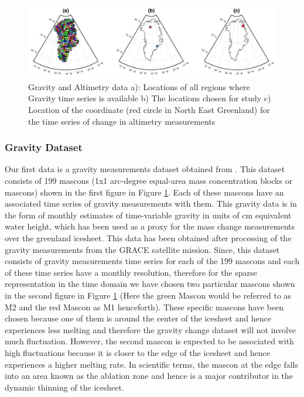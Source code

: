 \documentclass[procedia]{easychair}
\begin{document}
\begin{figure}[]  %
	\centering
	\includegraphics[width=5in]{grace_alt}
	\caption[Optional caption]{Gravity and Altimetry data a): Locations of all regions where Gravity time series is available b) The locations chosen for study c) Location of the coordinate (red circle in North East Greenland) for the time series of change in altimetry measurements }
	\label{fig2} %
\end{figure}

\subsubsection{Gravity Dataset}

Our first data is a gravity measurements dataset obtained from \cite{luthcke2013antarctica}. This dataset consists of 199 mascons (1x1 arc-degree equal-area mass concentration blocks or mascons) shown in the first figure in Figure \ref{fig2}. Each of these mascons have an associated time series of gravity measurements with them. This gravity data is in the form of monthly estimates of time-variable gravity in units of cm equivalent water height, which has been used as a proxy for the mass change measurements over the greenland icesheet. This data has been obtained after processing of the gravity measurements from the GRACE satellite mission. Since, this dataset consists of gravity measurements time series for each of the 199 mascons and each of these time series have a monthly resolution, therefore for the sparse representation in the time domain we have chosen two particular mascons shown in the second figure in Figure \ref{fig2} (Here the green Mascon would be referred to as M2 and the red Mascon as M1 henceforth). These specific mascons have been chosen because one of them is around the center of the icesheet and hence experiences less melting and therefore the gravity change dataset will not involve much fluctuation. However, the second mascon is expected to be associated with high fluctuations because it is closer to the edge of the icesheet and hence experiences a higher melting rate. In scientific terms, the mascon at the edge falls into an area known as the ablation zone and hence is a major contributor in the dynamic thinning of the icesheet.
\end{document}
